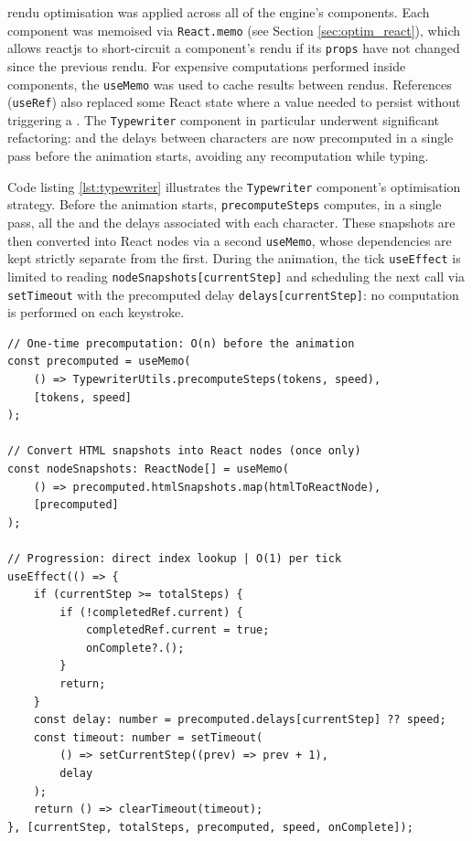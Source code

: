 
\Gls{rendu} optimisation was applied across all of the engine's components. Each component was memoised via \texttt{React.memo} (see Section \ref{sec:optim_react}), which allows \gls{reactjs} to short-circuit a component's \gls{rendu} if its \texttt{props} have not changed since the previous \gls{rendu}. For expensive computations performed inside components, the \texttt{useMemo}  was used to cache results between \glspl{rendu}. References (\texttt{useRef}) also replaced some React state where a value needed to persist without triggering a . The \texttt{Typewriter} component in particular underwent significant refactoring:  and the delays between characters are now precomputed in a single pass before the animation starts, avoiding any recomputation while typing.

Code listing \ref{lst:typewriter} illustrates the \texttt{Typewriter} component's optimisation strategy. Before the animation starts, \texttt{precomputeSteps} computes, in a single pass, all the  and the delays associated with each character. These snapshots are then converted into React nodes via a second \texttt{useMemo}, whose dependencies are kept strictly separate from the first. During the animation, the tick \texttt{useEffect} is limited to reading \texttt{nodeSnapshots[currentStep]} and scheduling the next call via \texttt{setTimeout} with the precomputed delay \texttt{delays[currentStep]}: no computation is performed on each keystroke.

\begin{listing}[H]
\begin{verbatim}
// One-time precomputation: O(n) before the animation
const precomputed = useMemo(
    () => TypewriterUtils.precomputeSteps(tokens, speed),
    [tokens, speed]
);

// Convert HTML snapshots into React nodes (once only)
const nodeSnapshots: ReactNode[] = useMemo(
    () => precomputed.htmlSnapshots.map(htmlToReactNode),
    [precomputed]
);

// Progression: direct index lookup | O(1) per tick
useEffect(() => {
    if (currentStep >= totalSteps) {
        if (!completedRef.current) {
            completedRef.current = true;
            onComplete?.();
        }
        return;
    }
    const delay: number = precomputed.delays[currentStep] ?? speed;
    const timeout: number = setTimeout(
        () => setCurrentStep((prev) => prev + 1),
        delay
    );
    return () => clearTimeout(timeout);
}, [currentStep, totalSteps, precomputed, speed, onComplete]);
\end{verbatim}
\caption{Precomputation of HTML snapshots and delays in the \textit{Typewriter} component (Author 2026)}
\label{lst:typewriter}
\end{listing}

